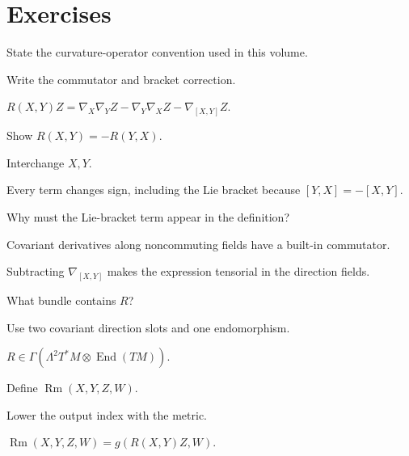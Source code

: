 \section{Exercises}
\begin{exercise}\label{exr:vii26-01}
State the curvature-operator convention used in this volume.
\end{exercise}
\begin{hint}
Write the commutator and bracket correction.
\end{hint}
\begin{solution}
\(R(X,Y)Z=\nabla_X\nabla_YZ-\nabla_Y\nabla_XZ-\nabla_{[X,Y]}Z\).
\end{solution}

\begin{exercise}\label{exr:vii26-02}
Show \(R(X,Y)=-R(Y,X)\).
\end{exercise}
\begin{hint}
Interchange \(X,Y\).
\end{hint}
\begin{solution}
Every term changes sign, including the Lie bracket because \([Y,X]=-[X,Y]\).
\end{solution}

\begin{exercise}\label{exr:vii26-03}
Why must the Lie-bracket term appear in the definition?
\end{exercise}
\begin{hint}
Covariant derivatives along noncommuting fields have a built-in commutator.
\end{hint}
\begin{solution}
Subtracting \(\nabla_{[X,Y]}\) makes the expression tensorial in the direction fields.
\end{solution}

\begin{exercise}\label{exr:vii26-04}
What bundle contains \(R\)?
\end{exercise}
\begin{hint}
Use two covariant direction slots and one endomorphism.
\end{hint}
\begin{solution}
\(R\in\Gamma(\Lambda^2T^*M\otimes\operatorname{End}(TM))\).
\end{solution}

\begin{exercise}\label{exr:vii26-05}
Define \(\operatorname{Rm}(X,Y,Z,W)\).
\end{exercise}
\begin{hint}
Lower the output index with the metric.
\end{hint}
\begin{solution}
\(\operatorname{Rm}(X,Y,Z,W)=g(R(X,Y)Z,W)\).
\end{solution}

